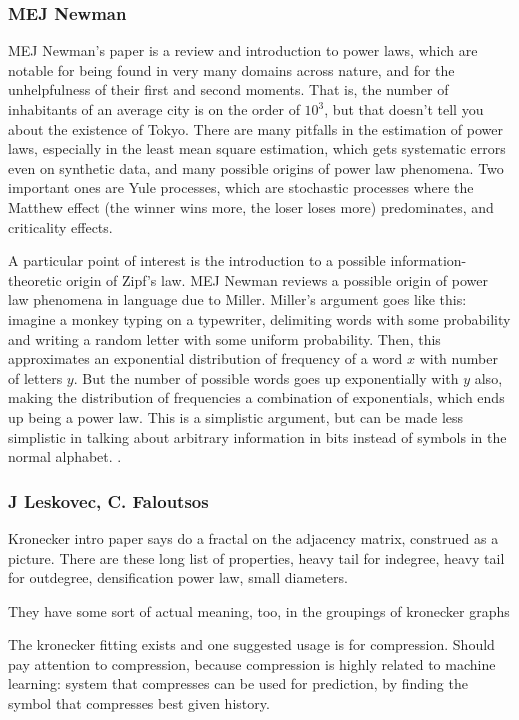 \documentclass[12pt]{article}
\begin{document}
\subsubsection{MEJ Newman}
MEJ Newman's paper is a review and introduction to power laws, which are notable for being found in very many domains across nature, and for the unhelpfulness of their first and second moments. That is, the number of inhabitants of an average city is on the order of $10^3$, but that doesn't tell you about the existence of Tokyo. There are many pitfalls in the estimation of power laws, especially in the least mean square estimation, which gets systematic errors even on synthetic data, and many possible origins of power law phenomena. Two important ones are Yule processes, which are stochastic processes where the Matthew effect (the winner wins more, the loser loses more) predominates, and criticality effects.

A particular point of interest is the introduction to a possible information-theoretic origin of Zipf's law. MEJ Newman reviews a possible origin of power law phenomena in language due to Miller. Miller's argument goes like this: imagine a monkey typing on a typewriter, delimiting words with some probability and writing a random letter with some uniform probability. Then, this approximates an exponential distribution of frequency of a word $x$ with number of letters $y$. But the number of possible words goes up exponentially with $y$ also, making the distribution of frequencies a combination of exponentials, which ends up being a power law. This is a simplistic argument, but can be made less simplistic in talking about arbitrary information in bits instead of symbols in the normal alphabet. %
. 

\subsubsection{J Leskovec, C. Faloutsos}
Kronecker intro paper says do a fractal on the adjacency matrix, construed as a picture. There are these long list of properties, heavy tail for indegree, heavy tail for outdegree, densification power law, small diameters.

They have some sort of actual meaning, too, in the groupings of kronecker graphs

The kronecker fitting exists and one suggested usage is for compression. Should pay attention to compression, because compression is highly related to machine learning: system that compresses can be used for prediction, by finding the symbol that compresses best given history.
\end{document}
